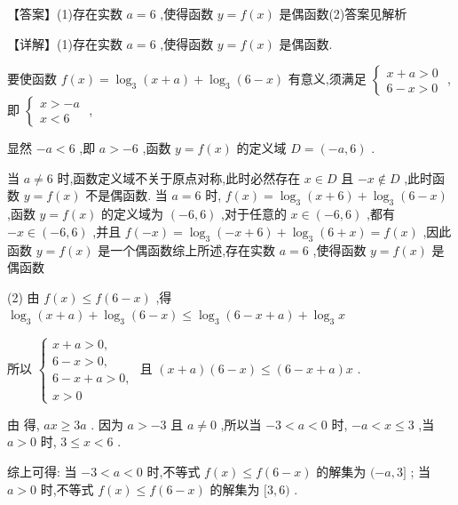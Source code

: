\documentclass[10pt]{article}
\newcommand*\circled[1]{\tikz[baseline=(char.base)]{\node[shape=circle,draw,inner sep=1.5pt] (char) {\small #1};}}
\begin{document}
【答案】(1)存在实数 \(a = 6\) ,使得函数 \(y = f\left( x\right)\) 是偶函数(2)答案见解析

【详解】(1)存在实数 \(a = 6\) ,使得函数 \(y = f\left( x\right)\) 是偶函数.

要使函数 \(f\left( x\right)  = {\log }_{3}\left( {x + a}\right)  + {\log }_{3}\left( {6 - x}\right)\) 有意义,须满足 \(\left\{  \begin{array}{l} x + a > 0 \\  6 - x > 0 \end{array}\right.\) ,即 \(\left\{  \begin{array}{l} x >  - a \\  x < 6 \end{array}\right.\) ,

显然 \(- a < 6\) ,即 \(a >  - 6\) ,函数 \(y = f\left( x\right)\) 的定义域 \(D = \left( {-a,6}\right)\) .

当 \(a \neq  6\) 时,函数定义域不关于原点对称,此时必然存在 \(x \in  D\) 且 \(- x \notin  D\) ,此时函数 \(y = f\left( x\right)\) 不是偶函数. 当 \(a = 6\) 时, \(f\left( x\right)  = {\log }_{3}\left( {x + 6}\right)  + {\log }_{3}\left( {6 - x}\right)\) ,函数 \(y = f\left( x\right)\) 的定义域为 \(\left( {-6,6}\right)\) ,对于任意的 \(x \in  \left( {-6,6}\right)\) ,都有 \(- x \in  \left( {-6,6}\right)\) ,并且 \(f\left( {-x}\right)  = {\log }_{3}\left( {-x + 6}\right)  + {\log }_{3}\left( {6 + x}\right)  = f\left( x\right)\) ,因此函数 \(y = f\left( x\right)\) 是一个偶函数综上所述,存在实数 \(a = 6\) ,使得函数 \(y = f\left( x\right)\) 是偶函数

(2) 由 \(f\left( x\right)  \leq  f\left( {6 - x}\right)\) ,得 \({\log }_{3}\left( {x + a}\right)  + {\log }_{3}\left( {6 - x}\right)  \leq  {\log }_{3}\left( {6 - x + a}\right)  + {\log }_{3}x\)

所以 \(\left\{  \begin{array}{l} x + a > 0, \\  6 - x > 0, \\  6 - x + a > 0, \\  x > 0 \end{array}\right.\) 且 \(\left( {x + a}\right) \left( {6 - x}\right)  \leq  \left( {6 - x + a}\right) x\)  \circled{1} .

由 \circled{1} 得, \({ax} \geq  {3a}\) . 因为 \(a >  - 3\) 且 \(a \neq  0\) ,所以当 \(- 3 < a < 0\) 时, \(- a < x \leq  3\) ,当 \(a > 0\) 时, \(3 \leq  x < 6\) .

综上可得: 当 \(- 3 < a < 0\) 时,不等式 \(f\left( x\right)  \leq  f\left( {6 - x}\right)\) 的解集为 \(( - a,3\rbrack\) ; 当 \(a > 0\) 时,不等式 \(f\left( x\right)  \leq  f\left( {6 - x}\right)\) 的解集为 \(\lbrack 3,6)\) .
\end{document}
